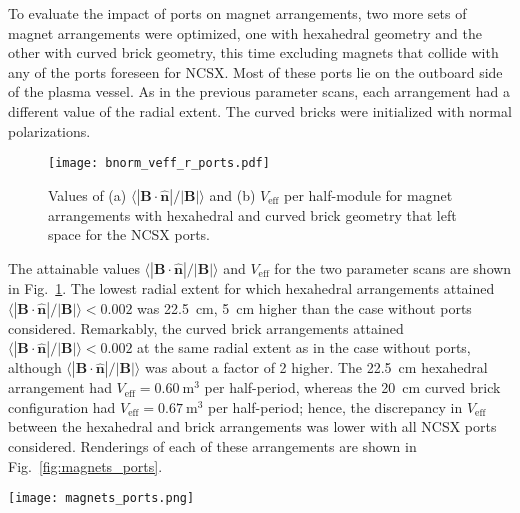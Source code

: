 \documentclass[11pt,onecolumn]{article}
\newcommand{\relbnorm}{\langle|\mathbf{B}\cdot\hat{\mathbf{n}}|
                       /|\mathbf{B}|\rangle}
\begin{document}
To evaluate the impact of ports on magnet arrangements, two more
sets of magnet arrangements were optimized, one with hexahedral geometry and
the other with curved brick geometry, this time excluding magnets
that collide with any of the ports foreseen for NCSX. Most of these ports
lie on the outboard side of the plasma vessel. As in the previous parameter
scans, each arrangement had a different value of the radial extent. 
The curved bricks were initialized with normal polarizations.

\begin{figure}
    \begin{center}
    \texttt{[image: bnorm\_veff\_r\_ports.pdf]}
    \caption{Values of (a) $\relbnorm$ and (b) $V_\text{eff}$ per half-module
             for magnet arrangements with hexahedral and curved brick geometry
             that left space for the NCSX ports.}
    \label{fig:bnorm_veff_ports}
    \end{center}
\end{figure}

The attainable values $\relbnorm$ and $V_\text{eff}$ for the two parameter 
scans are shown in Fig.~\ref{fig:bnorm_veff_ports}. The lowest radial extent 
for which hexahedral
arrangements attained $\relbnorm<0.002$ was 22.5~cm, 5~cm higher than the
case without ports considered. Remarkably, the curved brick arrangements
attained $\relbnorm<0.002$ at the same radial extent as in the case without
ports, although $\relbnorm$ was about a factor of 2 higher. The 22.5~cm
hexahedral arrangement had $V_\text{eff}=0.60~\text{m}^3$ per half-period, 
whereas the 20~cm curved brick configuration had 
$V_\text{eff}=0.67~\text{m}^3$ per half-period; hence, the discrepancy in 
$V_\text{eff}$ between the hexahedral and brick arrangements was lower with
all NCSX ports considered. Renderings of each of these arrangements are
shown in Fig.~\ref{fig:magnets_ports}.

\begin{figure*}
    \begin{center}
    \texttt{[image: magnets\_ports.png]}
    \caption{Renderings of magnet arrangements that leave space for the
             NCSX ports, viewed from the outboard side. 
             (a) Hexahedra with a radial extent of 22.5~cm;
             (b) Curved bricks with a radial extent of 20~cm.}
    \label{fig:magnets_ports}
    \end{center}
\end{figure*}
\end{document}
